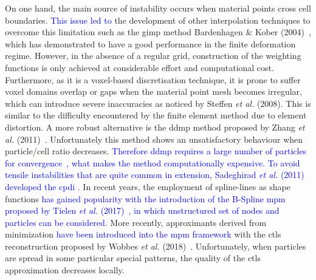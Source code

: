 \documentclass[preprint,12pt,a4paper]{elsarticle}
\begin{document}
On one hand, the main source of instability occurs when
material points cross cell boundaries. \textcolor{blue}{This issue led to} the development
of other interpolation techniques to overcome this limitation such as
the \acrfull{gimp} method Bardenhagen \& Kober (2004)~\cite{Bardenhagen2004}, which has
demonstrated to have a good performance in the finite deformation
regime. However, in the absence of a regular grid, construction of the
weighting functions is only achieved at considerable effort and
computational cost.  Furthermore, as it is a voxel-based
discretisation technique, it is prone to suffer voxel domains overlap
or gaps when the material point mesh becomes irregular, which can
introduce severe inaccuracies as noticed by Steffen {\it et al.}
(2008)\cite{Steffen2008}. This is similar to the difficulty
encountered by the finite element method due to element distortion.
A more robust alternative is the \acrfull{ddmp} method proposed by Zhang {\it et al.}
(2011)~\cite{Zhang2011a}. Unfortunately this method shows an
unsatisfactory behaviour when particle/cell ratio
decreases. \textcolor{blue}{Therefore \acrshort{ddmp} requires a large number of particles for convergence~\cite{DHAKAL2016301}, what makes the method computationally expensive.} \textcolor{blue}{To avoid tensile instabilities that are quite common in extension, Sadeghirad {\it et al.} (2011) \cite{Sadeghirad_et_al_IJNME_2011} developed the \acrshort{cpdi} \cite{Sadeghirad_et_al_IJNME_2011}}. In recent years, the employment of spline-lines as shape functions \textcolor{blue}{has gained popularity with the introduction of the B-Spline 
\acrshort{mpm} proposed by Tielen {\it et al.} (2017)~\cite{TIELEN2017265}, in which unstructured set of nodes and
particles can be considered}. More recently, approximants derived from minimization \textcolor{blue}{have
been introduced into the \acrshort{mpm} framework} with the \acrfull{ctls}
reconstruction proposed by Wobbes {\it et al.}
(2018)~\cite{E_Wobbes_2018}. Unfortunately, when particles are spread
in some particular special patterns, the quality of the \acrshort{ctls} approximation decreases locally.
\end{document}
